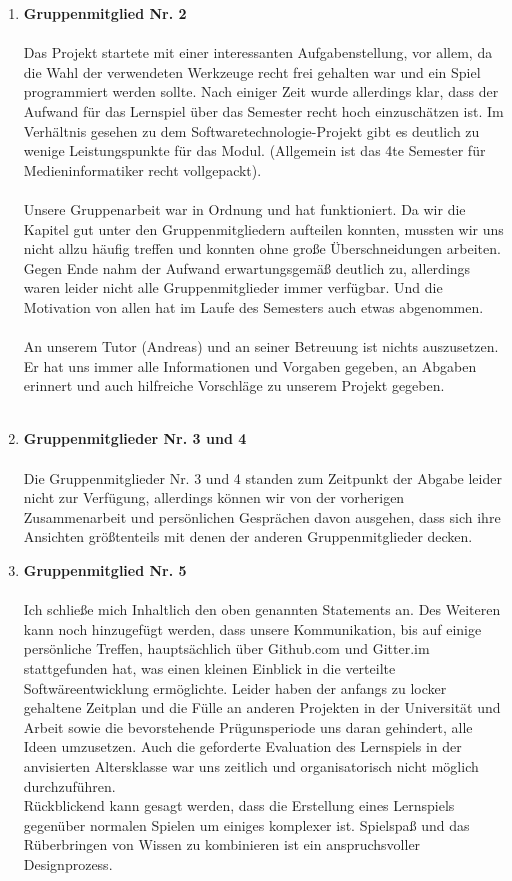 \documentclass[a4paper]{article}
\begin{document}
\begin{enumerate}
    \item \textbf{Gruppenmitglied Nr. 2}\\
    \\
    Das Projekt startete mit einer interessanten Aufgabenstellung, vor allem, da die Wahl der verwendeten Werkzeuge recht frei gehalten war und ein Spiel programmiert werden sollte. Nach einiger Zeit wurde allerdings klar, dass der Aufwand für das Lernspiel über das Semester recht hoch einzuschätzen ist. Im Verhältnis gesehen zu dem Softwaretechnologie-Projekt gibt es deutlich zu wenige Leistungspunkte für das Modul. (Allgemein ist das 4te Semester für Medieninformatiker recht vollgepackt).\\
    \\
    Unsere Gruppenarbeit war in Ordnung und hat funktioniert. Da wir die Kapitel gut unter den Gruppenmitgliedern aufteilen konnten, mussten wir uns nicht allzu häufig treffen und konnten ohne große Überschneidungen arbeiten. Gegen Ende nahm der Aufwand erwartungsgemäß deutlich zu, allerdings waren leider nicht alle Gruppenmitglieder immer verfügbar. Und die Motivation von allen hat im Laufe des Semesters auch etwas abgenommen.\\
    \\
    An unserem Tutor (Andreas) und an seiner Betreuung ist nichts auszusetzen. Er hat uns immer alle Informationen und Vorgaben gegeben, an Abgaben erinnert und auch hilfreiche Vorschläge zu unserem Projekt gegeben.\\
    \\

    \item \textbf{Gruppenmitglieder Nr. 3 und 4}\\
    \\
    Die Gruppenmitglieder Nr. 3 und 4 standen zum Zeitpunkt der Abgabe leider nicht zur Verfügung, allerdings können wir von der vorherigen Zusammenarbeit und persönlichen Gesprächen davon ausgehen, dass sich ihre Ansichten größtenteils mit denen der anderen Gruppenmitglieder decken.
    \\

    \item \textbf{Gruppenmitglied Nr. 5}\\
    \\
    Ich schließe mich Inhaltlich den oben genannten Statements an. Des Weiteren kann noch hinzugefügt werden, dass unsere Kommunikation, bis auf einige persönliche Treffen, hauptsächlich über Github.com und Gitter.im stattgefunden hat, was einen kleinen Einblick in die verteilte Softwäreentwicklung ermöglichte. Leider haben der anfangs zu locker gehaltene Zeitplan und die Fülle an anderen Projekten in der Universität und Arbeit sowie die bevorstehende Prügunsperiode uns daran gehindert, alle Ideen umzusetzen. Auch die geforderte Evaluation des Lernspiels in der anvisierten Altersklasse war uns zeitlich und organisatorisch nicht möglich durchzuführen.
    \\
    Rückblickend kann gesagt werden, dass die Erstellung eines Lernspiels gegenüber normalen Spielen um einiges komplexer ist. Spielspaß und das Rüberbringen von Wissen zu kombinieren ist ein anspruchsvoller Designprozess.
    \\


\end{enumerate}
\end{document}
